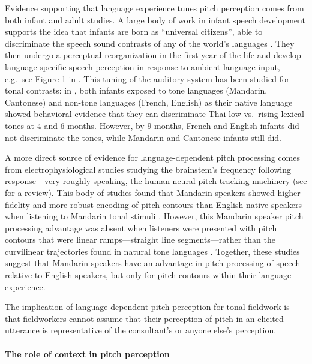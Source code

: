 \documentclass[12pt]{article}
\begin{document}
Evidence supporting that language experience tunes pitch perception comes from
both infant and adult studies. A large body of work in infant speech
development supports the idea that infants are born as ``universal
citizens'', able to discriminate the speech sound contrasts of any of
the world's languages . They then undergo a perceptual reorganization
in the first year of the life and develop language-specific speech
perception in response to ambient language input, e.g.\ see Figure 1
in \citet{Kuhl:2004}. This tuning of the auditory system has been
studied for tonal contrasts: in \citet{Mattock:2006,Mattock:2008}, both infants exposed to tone
languages (Mandarin, Cantonese) and non-tone languages (French,
English) as their native language showed behavioral evidence that they
can discriminate Thai low vs.\ rising lexical tones at 4 and 6
months. However, by 9 months, French and English infants did not
discriminate the tones, while Mandarin and Cantonese infants still did.

A more direct source of evidence for language-dependent pitch
processing comes from electrophysiological studies studying the
brainstem's frequency following response---very roughly speaking, the
human neural pitch tracking machinery (see \citet{Krishnan:2009a} for a
review). This body of studies found that Mandarin speakers showed
higher-fidelity and more robust encoding of pitch contours than
English native speakers when listening to Mandarin tonal stimuli
\citep{Krishnan:2005}. However, this Mandarin speaker pitch processing
advantage was absent when listeners were presented with pitch
contours that were linear ramps---straight line segments---rather than
the curvilinear trajectories found in natural tone languages
\citep{Xu:2006a}. Together, these studies suggest that Mandarin
speakers have an advantage in pitch processing of speech relative to
English speakers, but only for pitch contours within their language
experience.

The implication of language-dependent pitch perception for tonal
fieldwork is that fieldworkers cannot assume that their perception of
pitch in an elicited utterance is representative of the consultant's
or anyone else's perception. 

\paragraph{The role of context in pitch perception}\hfill\break
\end{document}
